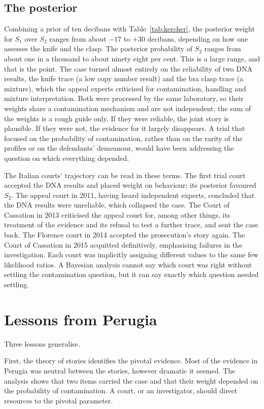 \subsection{The posterior}

Combining a prior of ten decibans with Table~\ref{tab:kercher}, the posterior weight for $S_1$ over $S_2$ ranges from about $-17$ to $+30$ decibans, depending on how one assesses the knife and the clasp. The posterior probability of $S_2$ ranges from about one in a thousand to about ninety eight per cent. This is a large range, and that is the point. The case turned almost entirely on the reliability of two DNA results, the knife trace (a low copy number result) and the bra clasp trace (a mixture), which the appeal experts criticised for contamination, handling and mixture interpretation. Both were processed by the same laboratory, so their weights share a contamination mechanism and are not independent; the sum of the weights is a rough guide only. If they were reliable, the joint story is plausible. If they were not, the evidence for it largely disappears. A trial that focused on the probability of contamination, rather than on the rarity of the profiles or on the defendants' demeanour, would have been addressing the question on which everything depended.

The Italian courts' trajectory can be read in these terms. The first trial court accepted the DNA results and placed weight on behaviour; its posterior favoured $S_2$. The appeal court in 2011, having heard independent experts, concluded that the DNA results were unreliable, which collapsed the case. The Court of Cassation in 2013 criticised the appeal court for, among other things, its treatment of the evidence and its refusal to test a further trace, and sent the case back. The Florence court in 2014 accepted the prosecution's story again. The Court of Cassation in 2015 acquitted definitively, emphasising failures in the investigation. Each court was implicitly assigning different values to the same few likelihood ratios. A Bayesian analysis cannot say which court was right without settling the contamination question, but it can say exactly which question needed settling.

\section{Lessons from Perugia}

Three lessons generalise.

First, the theory of stories identifies the pivotal evidence. Most of the evidence in Perugia was neutral between the stories, however dramatic it seemed. The analysis shows that two items carried the case and that their weight depended on the probability of contamination. A court, or an investigator, should direct resources to the pivotal parameter.

